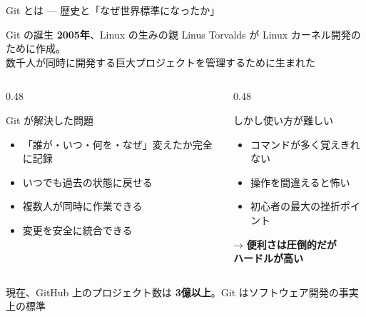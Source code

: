 \documentclass[aspectratio=169, 14pt]{beamer}
\begin{document}
\begin{frame}{Git とは — 歴史と「なぜ世界標準になったか」}
  \begin{block}{Git の誕生}
    {\small
    \textbf{2005年}、Linux の生みの親 Linus Torvalds が Linux カーネル開発のために作成。\\
    数千人が同時に開発する巨大プロジェクトを管理するために生まれた}
  \end{block}

  \vspace{0.3em}

  \begin{columns}[T]
    \begin{column}{0.48\textwidth}
      \begin{exampleblock}{Git が解決した問題}
        \begin{itemize}\footnotesize
          \item 「誰が・いつ・何を・なぜ」変えたか完全に記録
          \item いつでも過去の状態に戻せる
          \item 複数人が同時に作業できる
          \item 変更を安全に統合できる
        \end{itemize}
      \end{exampleblock}
    \end{column}
    \begin{column}{0.48\textwidth}
      \begin{alertblock}{しかし使い方が難しい}
        \begin{itemize}\footnotesize
          \item コマンドが多く覚えきれない
          \item 操作を間違えると怖い
          \item 初心者の最大の挫折ポイント
        \end{itemize}
        \vspace{0.3em}
        {\footnotesize → \textbf{便利さは圧倒的だが\\ハードルが高い}}
      \end{alertblock}
    \end{column}
  \end{columns}

  \vspace{0.3em}

  {\footnotesize 現在、GitHub 上のプロジェクト数は \textbf{3億以上}。Git はソフトウェア開発の事実上の標準}
\end{frame}
\end{document}
